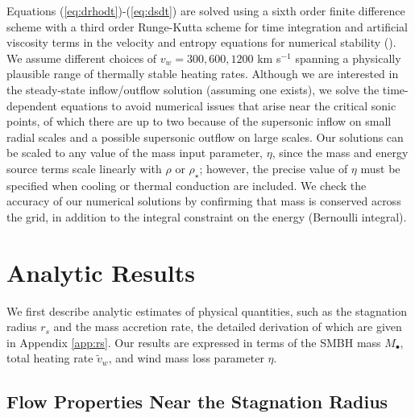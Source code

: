 \documentclass[usenatbib,fleqn]{mn2e}
\newcommand{\rs}{r_s}
\begin{document}
Equations (\ref{eq:drhodt})-(\ref{eq:dsdt}) are solved using a sixth
order finite difference scheme with a third order Runge-Kutta scheme
for time integration and artificial viscosity terms in the velocity
and entropy equations for numerical stability
(\citealt{Brandenburg:2003a}).  We assume different choices of $v_{w}
= 300, 600, 1200$ km s$^{-1}$ spanning a physically plausible range of
thermally stable heating rates.  Although we are
interested in the steady-state inflow/outflow solution (assuming one
exists), we solve the time-dependent equations to avoid numerical
issues that arise near the critical sonic points, of which there are
up to two because of the supersonic inflow on small radial scales and
a possible supersonic outflow on large scales.  Our
solutions can be scaled to any value of the mass input parameter,
$\eta$, since the mass and energy source terms scale linearly with
$\rho$ or $\rho_{\star}$; however, the precise value of $\eta$ must be
specified when cooling or thermal conduction are included.  We check the accuracy of
our numerical solutions by confirming that mass is conserved across
the grid, in addition to the integral constraint on the energy
(Bernoulli integral).



\section{Analytic Results}
\label{sec:results}

We first describe analytic estimates of physical quantities, such as
the stagnation radius $\rs$ and the mass accretion rate, the detailed
derivation of which are given in Appendix \ref{app:rs}.  Our results
are expressed in terms of the SMBH mass $M_{\bullet}$, total heating
rate $\tilde{v}_{w}$, and wind mass loss parameter $\eta$.

\subsection{Flow Properties Near the Stagnation Radius}
\end{document}
